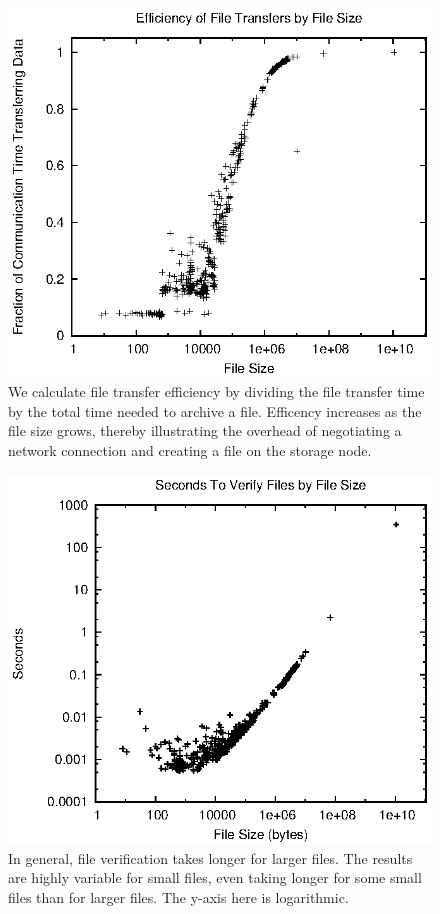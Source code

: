 \begin{figure}[!ht]
\includegraphics[width=\linewidth]{fig7.eps}
\caption{We calculate file transfer efficiency by dividing the file transfer time by the total time needed to archive a file.  Efficency increases as the file size grows, thereby illustrating the overhead of negotiating a network connection and creating a file on the storage node.}
\label{fig7}
\end{figure}

\begin{figure}[!ht]
\includegraphics[width=\linewidth]{fig8.eps}
\caption{In general, file verification takes longer for larger files.  The results are highly variable for small files, even taking longer for some small files than for larger files.  The y-axis here is logarithmic.}
\label{fig8}
\end{figure}
